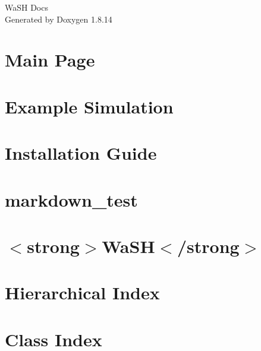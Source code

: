 \documentclass[twoside]{book}
\newcommand{\+}{\discretionary{\mbox{\scriptsize$\hookleftarrow$}}{}{}}
\newcommand{\clearemptydoublepage}{%
  \newpage{\pagestyle{empty}\cleardoublepage}%
}
\begin{document}
\hypersetup{pageanchor=false,
             bookmarksnumbered=true,
             pdfencoding=unicode
            }
\begin{titlepage}
\vspace*{7cm}
\begin{center}%
{\Large Wa\+SH Docs }\\
\vspace*{1cm}
{\large Generated by Doxygen 1.8.14}\\
\end{center}
\end{titlepage}
\clearemptydoublepage
{}
\tableofcontents
\clearemptydoublepage
{}
\hypersetup{pageanchor=true}

\chapter{Main Page}
\label{index}\hypertarget{index}{}
\chapter{Example Simulation}
\label{md_markdown_example_usecase}

\chapter{Installation Guide}
\label{md_markdown_installation}

\chapter{markdown\+\_\+test}
\label{md_markdown_markdown_test}

\chapter{$<$strong$>$Wa\+SH$<$/strong$>$}
\label{md__dcs_20_u2002000_4thYearProject_wash_README}

\chapter{Hierarchical Index}

\chapter{Class Index}

\end{document}
